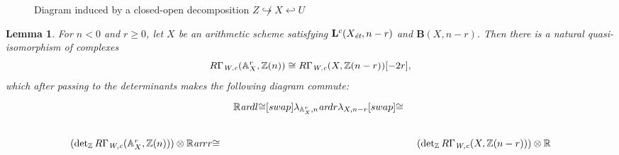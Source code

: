\documentclass[10pt,a4paper,oneside,draft]{article}
\newcommand{\RR}{\mathbb{R}}
\newcommand{\ZZ}{\mathbb{Z}}
\renewcommand{\AA}{\mathbb{A}}
\renewcommand{\det}{\operatorname{det}}
\newcommand{\ar}{\text{\it ar}}
\newcommand{\et}{\text{\it \'{e}t}}
\newcommand{\Wc}{\text{\it W,c}}
\theoremstyle{myplain}
\newtheorem{lemma}[theorem]{Lemma}
\theoremstyle{mydefinition}
\numberwithin{equation}{section}
\begin{document}
\begin{landscape}
\begin{figure}
    \caption{Diagram induced by a closed-open decomposition
      $Z \not\hookrightarrow X \hookleftarrow U$}
    \label{fig:Regulators-and-closed-open-decompositions}
  \end{figure}
\end{landscape}

\begin{lemma}
  \label{lemma:lambda-and-affine-bundles}
  For $n < 0$ and $r \ge 0$, let $X$ be an arithmetic scheme satisfying
  $\mathbf{L}^c (X_\et,n-r)$ and $\mathbf{B} (X,n-r)$. Then there is a natural
  quasi-isomorphism of complexes
  \begin{equation}
    \label{eqn:RGamma-Wc-and-affine-bundles}
    R\Gamma_\Wc (\AA^r_X, \ZZ (n)) \cong R\Gamma_\Wc (X, \ZZ (n-r)) [-2r],
  \end{equation}
  which after passing to the determinants makes the following diagram commute:
  \begin{equation}
    \label{eqn:lambda-and-affine-bundles}
    \begin{tikzcd}[column sep=0.5em]
    & \RR\ar{dl}{\cong}[swap]{\lambda_{\AA^r_X,n}}\ar{dr}{\lambda_{X,n-r}}[swap]{\cong} \\
      (\det_\ZZ R\Gamma_\Wc (\AA^r_X, \ZZ (n)))\otimes \RR \ar{rr}{\cong} & & (\det_\ZZ R\Gamma_\Wc (X, \ZZ (n-r)))\otimes \RR
    \end{tikzcd}
  \end{equation}


\end{lemma}
\end{document}
